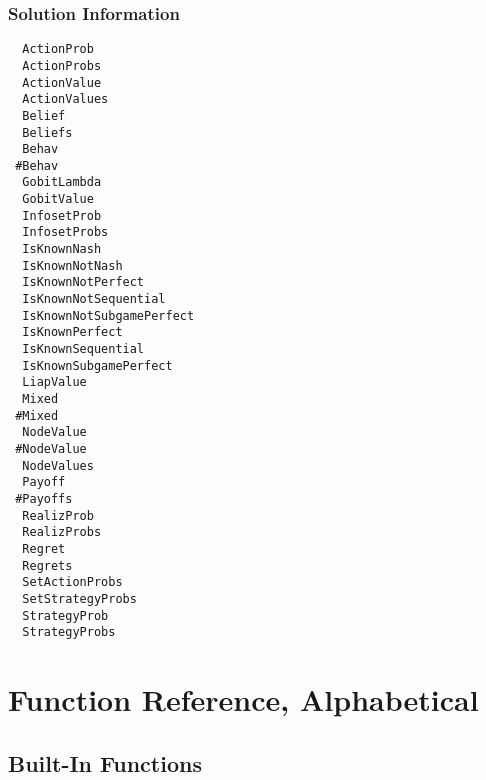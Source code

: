 \subsection{Solution Information}

\begin{multicols}{3}
\begin{verbatim}
  ActionProb 
  ActionProbs 
  ActionValue 
  ActionValues 
  Belief 
  Beliefs 
  Behav 
 #Behav 
  GobitLambda 
  GobitValue 
  InfosetProb 
  InfosetProbs 
  IsKnownNash 
  IsKnownNotNash 
  IsKnownNotPerfect 
  IsKnownNotSequential 
  IsKnownNotSubgamePerfect 
  IsKnownPerfect 
  IsKnownSequential 
  IsKnownSubgamePerfect 
  LiapValue 
  Mixed
 #Mixed
  NodeValue 
 #NodeValue 
  NodeValues 
  Payoff 
 #Payoffs 
  RealizProb 
  RealizProbs 
  Regret
  Regrets
  SetActionProbs 
  SetStrategyProbs 
  StrategyProb 
  StrategyProbs 
\end{verbatim}
\end{multicols}

\chapter{Function Reference, Alphabetical}
\pagestyle{lexicon}

\section{Built-In Functions}

